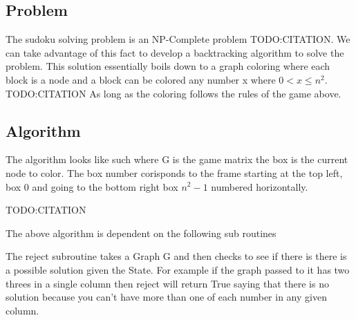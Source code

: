 \documentclass{sig-alternate}
\begin{document}
\subsection{Problem}
The sudoku solving problem is an NP-Complete problem TODO:CITATION. We can take
advantage of this fact to develop a backtracking algorithm to solve the problem. This solution
essentially boils down to a graph coloring where each block is a node and a block can be colored any number x where $0 < x \le n^2$. TODO:CITATION
As long as the coloring follows the rules of the game above. 

\subsection{Algorithm}
The algorithm looks like such where G is the game matrix the box is the current node to color. The box number corisponds to the frame starting at the top left, box 0 and going to the bottom right box $n^2 - 1$ numbered horizontally.
TODO:CITATION

The above algorithm is dependent on the following sub routines

The reject subroutine takes a Graph G and then checks to see if there is there is
a possible solution given the State. For example if the graph passed to it has two threes in a single column then reject will return True saying that there is no solution because you can't have more than one of each number in any given column. 
\end{document}
